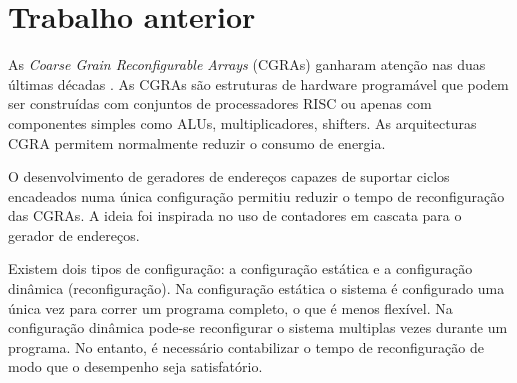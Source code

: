 

\chapter{Trabalho anterior}
\label{chapter:Trabalho anterior}

As { \it Coarse Grain Reconfigurable Arrays} (CGRAs) ganharam atenção nas duas últimas décadas \cite{Mei05,Lee00,Weinhardt03,Quax04,deSousa12}. As CGRAs são estruturas de hardware programável que podem ser construídas com conjuntos de processadores RISC ou apenas com componentes simples como ALUs, multiplicadores, shifters\cite{Tripp07,deSousa12}. As arquitecturas CGRA permitem normalmente reduzir o consumo de energia.
                  
O desenvolvimento de geradores de endereços capazes de suportar ciclos encadeados numa única configuração permitiu reduzir o tempo de reconfiguração das CGRAs\cite{deSutter10}. A ideia foi inspirada no uso de contadores em cascata para o gerador de endereços\cite{Carta06}. 
                         
Existem dois tipos de configuração: a configuração estática e a configuração dinâmica (reconfiguração). Na configuração estática o sistema é configurado uma única vez para correr um programa completo, o que é menos flexível\cite{Hartenstein01}. Na configuração dinâmica pode-se reconfigurar o sistema multiplas vezes durante um programa. No entanto, é necessário contabilizar o tempo de reconfiguração de modo que o desempenho seja satisfatório. 
                             
